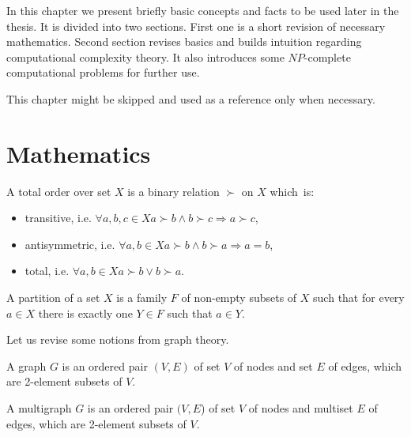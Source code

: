 In this chapter we present briefly basic concepts and facts to be used later in the thesis.
It is divided into two sections.
First one is a short revision of necessary mathematics.
Second section revises basics and builds intuition regarding computational complexity theory.
It also introduces some $NP$-complete computational problems for further use.

This chapter might be skipped and used as a reference only when necessary.

\section{Mathematics}

\begin{defn}
A total order over set $X$ is a binary relation $\succ$ on $X$ which~is:
\begin{itemize}
	\item transitive, i.e. $\forall a,b,c \in X a \succ b \land b \succ c \Rightarrow a \succ c$,
	\item antisymmetric, i.e. $\forall a,b \in X a \succ b \land b \succ a \Rightarrow a=b $,
	\item total, i.e. $\forall a,b \in X a \succ b \lor b \succ a$.
\end{itemize}
\end{defn}


\begin{defn}
A partition of a set $X$ is a family $F$ of non-empty subsets of $X$
such that for every $a \in X$ there is exactly one $Y \in F$ such that $a \in Y$.
\end{defn}


Let us revise some notions from graph theory.

\begin{defn}[graph]
A graph $G$ is an ordered pair $(V,E)$ of set $V$ of nodes
and set $E$ of edges, which are 2-element subsets of $V$.
\end{defn}

\begin{defn}[multigraph]
A multigraph $G$ is an ordered pair $(V,E$) of set $V$ of nodes
and multiset $E$ of edges, which are 2-element subsets of $V$.
\end{defn}




